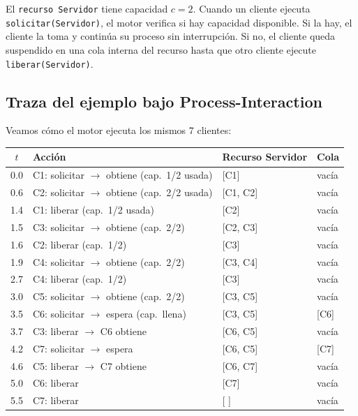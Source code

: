 \documentclass[11pt, letterpaper]{article}
\begin{document}
El \texttt{recurso Servidor} tiene capacidad $c = 2$. Cuando un cliente ejecuta \texttt{solicitar(Servidor)}, el motor verifica si hay capacidad disponible. Si la hay, el cliente la toma y continúa su proceso sin interrupción. Si no, el cliente queda suspendido en una cola interna del recurso hasta que otro cliente ejecute \texttt{liberar(Servidor)}.

\subsection{Traza del ejemplo bajo Process-Interaction}

Veamos cómo el motor ejecuta los mismos 7 clientes:

\begin{center}
\small
\renewcommand{\arraystretch}{1.15}
\begin{tabular}{@{}clll@{}}
\toprule
$t$ & Acción & Recurso Servidor & Cola \\
\midrule
0.0 & C1: solicitar $\to$ \textcolor{verdeoscuro}{obtiene} (cap.\ 1/2 usada) & [C1] & vacía \\
0.6 & C2: solicitar $\to$ \textcolor{verdeoscuro}{obtiene} (cap.\ 2/2 usada) & [C1, C2] & vacía \\
1.4 & C1: liberar (cap.\ 1/2 usada) & [C2] & vacía \\
1.5 & C3: solicitar $\to$ \textcolor{verdeoscuro}{obtiene} (cap.\ 2/2) & [C2, C3] & vacía \\
1.6 & C2: liberar (cap.\ 1/2) & [C3] & vacía \\
1.9 & C4: solicitar $\to$ \textcolor{verdeoscuro}{obtiene} (cap.\ 2/2) & [C3, C4] & vacía \\
2.7 & C4: liberar (cap.\ 1/2) & [C3] & vacía \\
3.0 & C5: solicitar $\to$ \textcolor{verdeoscuro}{obtiene} (cap.\ 2/2) & [C3, C5] & vacía \\
3.5 & C6: solicitar $\to$ \textcolor{rojoclaro}{espera} (cap.\ llena) & [C3, C5] & [C6] \\
3.7 & C3: liberar $\to$ \textcolor{verdeoscuro}{C6 obtiene} & [C6, C5] & vacía \\
4.2 & C7: solicitar $\to$ \textcolor{rojoclaro}{espera} & [C6, C5] & [C7] \\
4.6 & C5: liberar $\to$ \textcolor{verdeoscuro}{C7 obtiene} & [C6, C7] & vacía \\
5.0 & C6: liberar & [C7] & vacía \\
5.5 & C7: liberar & \hspace{0.5em}[ ] & vacía \\
\bottomrule
\end{tabular}
\end{center}
\end{document}
